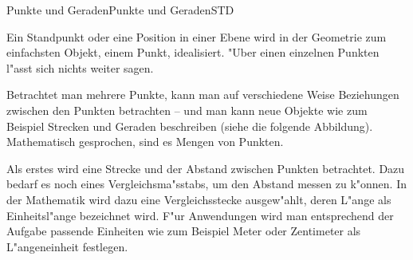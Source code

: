 \begin{MXContent}{Punkte und Geraden}{Punkte und Geraden}{STD}

Ein Standpunkt oder eine Position in einer Ebene wird in der Geometrie zum
einfachsten Objekt, einem Punkt, idealisiert. 
"Uber einen einzelnen Punkten l"asst sich nichts weiter sagen.

Betrachtet man mehrere Punkte, kann man auf verschiedene Weise Beziehungen 
zwischen den Punkten betrachten -- und man kann neue Objekte wie zum Beispiel
Strecken und Geraden beschreiben (siehe die folgende Abbildung).
Mathematisch gesprochen, sind es Mengen von Punkten.

\begin{center}
\end{center}

Als erstes wird eine Strecke und der Abstand zwischen Punkten betrachtet.
Dazu bedarf es noch eines Vergleichsma"sstabs, um den Abstand messen zu
k"onnen. In der Mathematik wird dazu eine Vergleichsstecke ausgew"ahlt, 
deren L"ange als Einheitsl"ange bezeichnet wird. F"ur Anwendungen wird 
man entsprechend der Aufgabe passende Einheiten wie zum Beispiel Meter 
oder Zentimeter als L"angeneinheit festlegen.


\end{MXContent}
